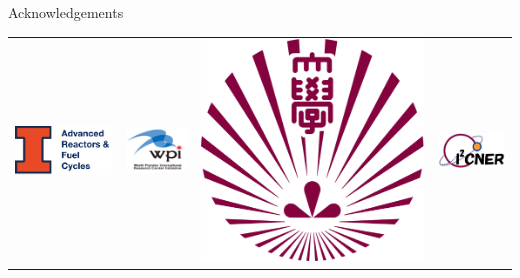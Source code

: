 \documentclass[final]{beamer}
\newlength{\onecolwid}
\begin{document}
\begin{frame}[t]
\begin{columns}
\begin{column}{\onecolwid}
\begin{block}{Acknowledgements}
\begin{center}
\begin{tabular}{cccc}
\includegraphics[scale=0.6]{arfc_logo.png} & \includegraphics[scale=0.5]{wpi_logo.png} & \includegraphics[scale=0.1]{ku_logo.png} &\includegraphics[scale=0.7]{i2cner_logo.png}

\end{tabular}
\end{center}
\end{block}
\end{column}
\end{columns}
\end{frame}
\end{document}
